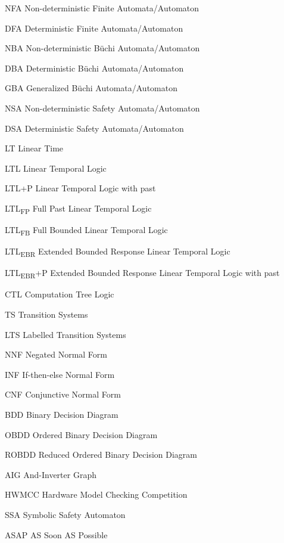
\begin{abbreviations}
\item[NFA] Non-deterministic Finite Automata/Automaton
\item[DFA] Deterministic Finite Automata/Automaton
\item[NBA] Non-deterministic B{\"u}chi Automata/Automaton
\item[DBA] Deterministic B{\"u}chi Automata/Automaton
\item[GBA] Generalized B{\"u}chi Automata/Automaton
\item[NSA] Non-deterministic Safety Automata/Automaton
\item[DSA] Deterministic Safety Automata/Automaton

\item[LT] Linear Time
\item[LTL] Linear Temporal Logic
\item[LTL+P] Linear Temporal Logic with past
\item[LTL\textsubscript{FP}] Full Past Linear Temporal Logic
\item[LTL\textsubscript{FB}] Full Bounded Linear Temporal Logic 
\item[LTL\textsubscript{EBR}] Extended Bounded Response Linear Temporal Logic 
\item[LTL\textsubscript{EBR}+P] Extended Bounded Response Linear Temporal Logic with past
\item[CTL] Computation Tree Logic

\item[TS] Transition Systems
\item[LTS] Labelled Transition Systems

\item[NNF] Negated Normal Form
\item[INF] If-then-else Normal Form
\item[CNF] Conjunctive Normal Form
\item[BDD] Binary Decision Diagram
\item[OBDD] Ordered Binary Decision Diagram
\item[ROBDD] Reduced Ordered Binary Decision Diagram 

\item[AIG] And-Inverter Graph
\item[HWMCC] Hardware Model Checking Competition


\item[SSA] Symbolic Safety Automaton

\item[ASAP] AS Soon AS Possible
\end{abbreviations}
